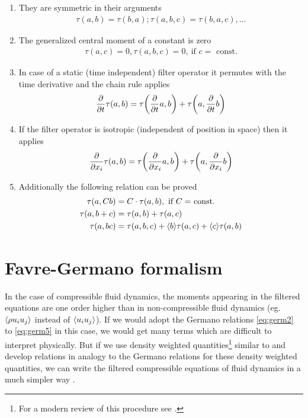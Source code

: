 \begin{enumerate}
\item  They are symmetric in their arguments
\begin{align}
\tau(a,b) = \tau(b,a) ; \tau(a,b,c)=\tau(b,a,c) , \ldots 
\end{align}
\item The generalized central moment of a constant is zero
\begin{align}
\tau(a,c) = 0, \tau(a,b,c) = 0,\ \text{if $c =$ const.}
\end{align}
\item In case of a static (time independent) filter operator 
it permutes with the time derivative and the chain rule applies
\begin{align}
\frac{\partial}{\partial t}\tau(a,b)=\tau{ \left( \frac{\partial}{\partial t}a,b \right) }+\tau{ \left( a,\frac{\partial}{\partial t}b \right) }
\end{align}
\item If the filter operator is isotropic (independent of 
position in space) then it applies
\begin{align}
\frac{\partial}{\partial x_i}\tau(a,b)=\tau{ \left( \frac{\partial}{\partial x_i}a,b \right) }+\tau{ \left( a,\frac{\partial}{\partial x_i}b \right) }
\end{align}
\item Additionally the following relation can be proved
\begin{align}
\tau(a,Cb) &= C\cdot \tau(a,b),\ \text{if $C =$ const.} \\
\tau(a,b+c) &= \tau(a,b) + \tau(a,c) \\
\tau(a,bc) &= \tau(a,b,c) + \langle b \rangle\tau(a,c) + \langle c \rangle\tau(a,b) 
\end{align}
\end{enumerate}
\section{Favre-Germano formalism} \label{FGform}
In the case of compressible fluid dynamics, the moments appearing in the
filtered equations are one order higher than in non-compressible
fluid dynamics (eg. $\langle \rho u_i u_j \rangle$ instead of $\langle u_i u_j \rangle$).
If we would adopt the Germano relations \eqref{eq:germ2} to \eqref{eq:germ5}
in this case, we would get many terms which are difficult to interpret
physically.
But if we use density weighted
quantities\footnote{For a modern review of this procedure
see \citet{Veynante2002}.} similar to \citet{Favre1969} and develop relations in
analogy to the Germano relations for these density weighted
quantities, we can write the filtered compressible equations of fluid dynamics
in a much simpler way \citep{Canuto1997,Schmidt2006}.

